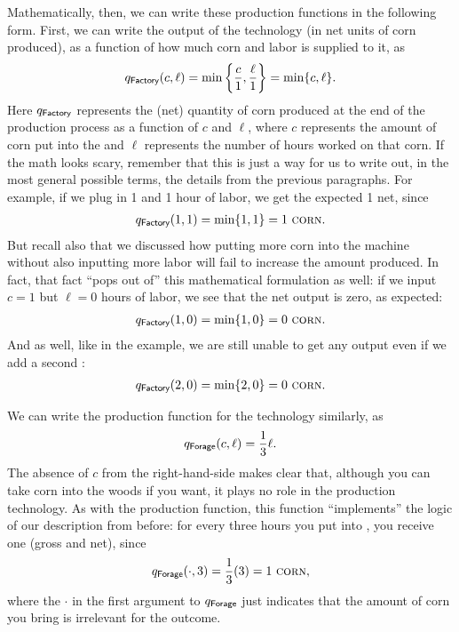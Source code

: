 Mathematically, then, we can write these production functions in the following form. First, we can write the output of the  technology (in net units of corn produced), as a function of how much corn and labor is supplied to it, as
\begin{align*}
q_{\textsf{Factory}}(c,\ell) = \min{\left\{\frac{c}{1},\frac{\ell}{1}\right\}} = \min\{c,\ell\}.
\end{align*}
Here $q_{\textsf{Factory}}$ represents the (net) quantity of corn produced at the end of the  production process as a function of $c$ and $\ell$, where $c$ represents the amount of corn put into the  and $\ell$ represents the number of hours worked on that corn. If the math looks scary, remember that this is just a way for us to write out, in the most general possible terms, the details from the previous paragraphs. For example, if we plug in 1 \Corn{} and 1 hour of labor, we get the expected 1 \Corn{} net, since
\begin{align*}
q_{\textsf{Factory}}(1,1) = \min\{1,1\} = 1~\textsc{corn}.
\end{align*}
But recall also that we discussed how putting more corn into the machine without also inputting more labor will fail to increase the amount produced. In fact, that fact ``pops out of'' this mathematical formulation as well: if we input $c = 1$ \Corn{} but $\ell = 0$ hours of labor, we see that the net output is zero, as expected:
\begin{align*}
q_{\textsf{Factory}}(1,0) = \min\{1,0\} = 0~\textsc{corn}.
\end{align*}
And as well, like in the example, we are still unable to get any output even if we add a second \Corn{}:
\begin{align*}
q_{\textsf{Factory}}(2,0) = \min\{2,0\} = 0 ~\textsc{corn}.
\end{align*}

We can write the production function for the  technology similarly, as
\begin{align*}
q_{\textsf{Forage}}(c,\ell) = \frac{1}{3}\ell.
\end{align*}
The absence of $c$ from the right-hand-side makes clear that, although you can take corn into the woods if you want, it plays no role in the  production technology. As with the  production function, this function ``implements'' the logic of our description from before: for every three hours you put into , you receive one \Corn{} (gross and net), since
\begin{align*}
q_{\textsf{Forage}}(\cdot, 3) = \frac{1}{3}(3) = 1~\textsc{corn},
\end{align*}
where the $\cdot$ in the first argument to $q_{\textsf{Forage}}$ just indicates that the amount of corn you bring is irrelevant for the outcome.

